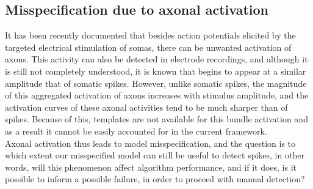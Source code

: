         \subsection{Misspecification due to axonal activation}
 It has been recently documented \cite{Lauren2014} that besides action potentials elicited by the targeted electrical stimulation of somas, there can be unwanted activation of axons. This activity can also be detected in electrode recordings, and although it is still not completely understood, it is known that begins to appear at a similar amplitude that of somatic spikes. However, unlike somatic spikes, the magnitude of this aggregated activation of axons increases with stimulus amplitude, and the activation curves of these axonal activities tend to be much sharper than of spikes. Because of this, templates are not available for this bundle activation and as a result it cannot be easily accounted for in the current framework. 
 \\ Axonal activation thus leads to model misspecification, and the question is to which extent our misspecified model can still be useful to detect spikes, in other words, will this phenomenon affect algorithm performance, and if it does, is it possible to inform a possible failure, in order to proceed with manual detection?\\
